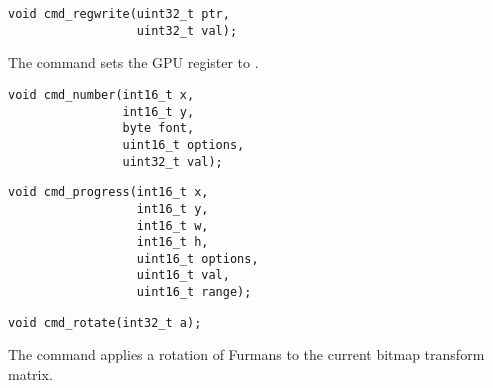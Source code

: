 
\begin{framed}
\begin{verbatim}
void cmd_regwrite(uint32_t ptr,
                  uint32_t val);
\end{verbatim}
\end{framed}

The  command
sets the GPU register  to .




\begin{framed}
\begin{verbatim}
void cmd_number(int16_t x,
                int16_t y,
                byte font,
                uint16_t options,
                uint32_t val);
\end{verbatim}
\end{framed}



\begin{framed}
\begin{verbatim}
void cmd_progress(int16_t x,
                  int16_t y,
                  int16_t w,
                  int16_t h,
                  uint16_t options,
                  uint16_t val,
                  uint16_t range);
\end{verbatim}
\end{framed}



\begin{framed}
\begin{verbatim}
void cmd_rotate(int32_t a);
\end{verbatim}
\end{framed}

The  command
applies a rotation of  Furmans to the
current bitmap transform matrix.

